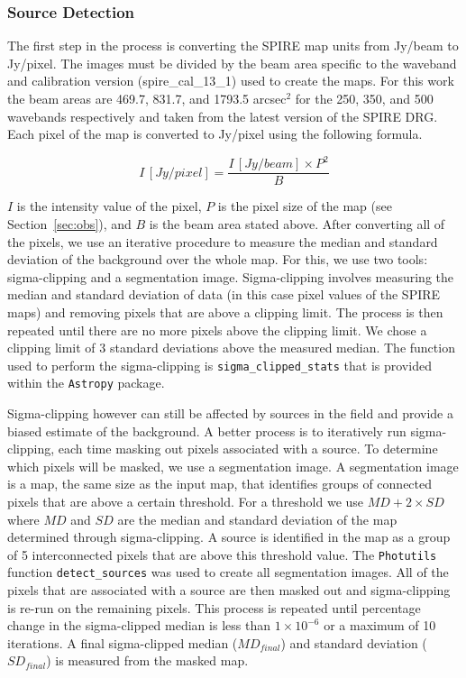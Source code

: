\subsubsection{Source Detection}
The first step in the process is converting the SPIRE map units from Jy/beam to Jy/pixel. The images must be divided by the beam area specific to the waveband and calibration version (spire\_cal_13\_1) used to create the maps. For this work the beam areas are 469.7, 831.7, and 1793.5 arcsec$^{2}$ for the 250, 350, and 500 \um{} wavebands respectively and taken from the latest version of the SPIRE DRG. Each pixel of the map is converted to Jy/pixel using the following formula.

\begin{equation}
I\,[Jy/pixel] = \frac{I\,[Jy/beam] \times P^2}{B}
\end{equation}

\noindent $I$ is the intensity value of the pixel, $P$ is the pixel size of the map (see Section~\ref{sec:obs}), and $B$ is the beam area stated above. After converting all of the pixels, we use an iterative procedure to measure the median and standard deviation of the background over the whole map. For this, we use two tools: sigma-clipping and a segmentation image. Sigma-clipping involves measuring the median and standard deviation of data (in this case pixel values of the SPIRE maps) and removing pixels that are above a clipping limit. The process is then repeated until there are no more pixels above the clipping limit. We chose a clipping limit of 3 standard deviations above the measured median. The function used to perform the sigma-clipping is \texttt{sigma\_clipped\_stats} that is provided within the \texttt{Astropy} \citep{Astropy:2013ek} package. 

Sigma-clipping however can still be affected by sources in the field and provide a biased estimate of the background. A better process is to iteratively run sigma-clipping, each time masking out pixels associated with a source. To determine which pixels will be masked, we use a segmentation image. A segmentation image is a map, the same size as the input map, that identifies groups of connected pixels that are above a certain threshold. For a threshold we use $MD + 2\times SD$ where $MD$ and $SD$ are the median and standard deviation of the map determined through sigma-clipping. A source is identified in the map as a group of 5 interconnected pixels that are above this threshold value. The \texttt{Photutils} function \texttt{detect\_sources} was used to create all segmentation images. All of the pixels that are associated with a source are then masked out and sigma-clipping is re-run on the remaining pixels. This process is repeated until percentage change in the sigma-clipped median is less than $1\times10^{-6}$ or a maximum of 10 iterations. A final sigma-clipped median ($MD_{final}$) and standard deviation ($SD_{final}$) is measured from the masked map.

